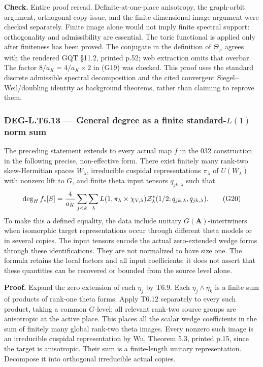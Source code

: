\documentclass[11pt,a4paper]{article}
\theoremstyle{definition}
\begin{document}
\textbf{Check.} Entire proof reread. Definite-at-one-place anisotropy, the graph-orbit argument, orthogonal-copy issue, and the finite-dimensional-image argument were checked separately. Finite image alone would not imply finite spectral support: orthogonality and admissibility are essential. The toric functional is applied only after finiteness has been proved. The conjugate in the definition of \(\Theta_\varphi\) agrees with the rendered GQT §11.2, printed p.52; web extraction omits that overbar. The factor \(8/a_K=4/a_K\times2\) in (G19) was checked. This proof uses the standard discrete admissible spectral decomposition and the cited convergent Siegel--Weil/doubling identity as background theorems, rather than claiming to reprove them.

\subsubsection{\texorpdfstring{DEG-L.T6.13 --- General degree as a finite standard-\(L(1)\) norm sum}{DEG-L.T6.13 --- General degree as a finite standard-L(1) norm sum}}\label{DEG-L.T6.13}

The preceding statement extends to every actual map \(f\) in the 032 construction in the following precise, non-effective form. There exist finitely many rank-two skew-Hermitian spaces \(W_\lambda\), irreducible cuspidal representations \(\pi_\lambda\) of \(U(W_\lambda)\) with nonzero lift to \(G\), and finite theta input tensors \(q_{jk,\lambda}\) such that \[
\deg_H f_*[S]
={4\over a_K}\sum_{j<k}\sum_\lambda
 L(1,\pi_\lambda\times\chi_{V,\lambda})
 \mathcal Z^*_{\lambda}(1/2;q_{jk,\lambda},q_{jk,\lambda}).
\tag{G20}
\] To make this a defined equality, the data include unitary \(G(\mathbf A)\)-intertwiners when isomorphic target representations occur through different theta models or in several copies. The input tensors encode the actual zero-extended wedge forms through these identifications. They are not normalized to have size one. The formula retains the local factors and all input coefficients; it does not assert that these quantities can be recovered or bounded from the source level alone.

\textbf{Proof.} Expand the zero extension of each \(\eta_j\) by T6.9. Each \(\eta_j\wedge\eta_k\) is a finite sum of products of rank-one theta forms. Apply T6.12 separately to every such product, taking a common \(G\)-level; all relevant rank-two source groups are anisotropic at the active place. This places all the scalar wedge coefficients in the sum of finitely many global rank-two theta images. Every nonzero such image is an irreducible cuspidal representation by Wu, Theorem 5.3, printed p.15, since the target is anisotropic. Their sum is a finite-length unitary representation. Decompose it into orthogonal irreducible actual copies.
\end{document}
